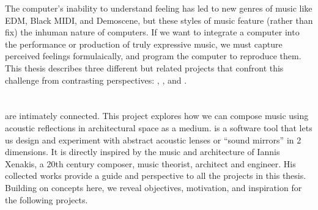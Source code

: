 The computer's inability to understand feeling has led to new genres
of music like EDM, Black MIDI, and
Demoscene, but these styles
of music feature (rather than fix) the inhuman nature of computers. If
we want to integrate a computer into the performance or production of
truly expressive music, we must capture perceived feelings
formulaically, and program the computer to reproduce them. This thesis
describes three different but related projects that confront this
challenge from contrasting perspectives: , \polytempic, and
\thesis.

\section{}
\label{sec:refmod-intro}
 are intimately connected. This project
explores how we can compose music using acoustic reflections in
architectural space as a medium.  is a software tool that lets
us design and experiment with abstract acoustic lenses or ``sound
mirrors'' in 2 dimensions. It is directly inspired by the music and
architecture of Iannis Xenakis, a 20th century composer, music
theorist, architect and engineer. His collected works provide a guide
and perspective to all the projects in this thesis. Building on
concepts here, we reveal objectives, motivation, and inspiration for
the following projects.

\section{\polytempic}
\label{sec:polytempic-intro}

